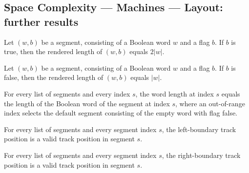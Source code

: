\subsection*{Space Complexity --- Machines --- Layout: further results}

\begin{lemma}
\label{Complexity.LogProg.rlen_of_doubled}
\leanok
{}
Let $(w,b)$ be a segment, consisting of a Boolean word $w$ and a flag $b$. If $b$ is
true, then the rendered length of $(w,b)$ equals $2|w|$.
\end{lemma}

\begin{lemma}
\label{Complexity.LogProg.rlen_of_plain}
\leanok
{}
Let $(w,b)$ be a segment, consisting of a Boolean word $w$ and a flag $b$. If $b$ is
false, then the rendered length of $(w,b)$ equals $|w|$.
\end{lemma}

\begin{lemma}
\label{Complexity.LogProg.wlen_eq}
\leanok
{}
For every list of segments and every index $s$, the word length at index $s$ equals the
length of the Boolean word of the segment at index $s$, where an out-of-range index
selects the default segment consisting of the empty word with flag false.
\end{lemma}

\begin{lemma}
\label{Complexity.LogProg.TPos.valid_left}
\leanok
{}
For every list of segments and every segment index $s$, the left-boundary track
position is a valid track position in segment $s$.
\end{lemma}

\begin{lemma}
\label{Complexity.LogProg.TPos.valid_right}
\leanok
{}
For every list of segments and every segment index $s$, the right-boundary track
position is a valid track position in segment $s$.
\end{lemma}

